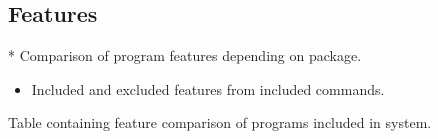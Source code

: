 \subsection{Features}\label{Features}

* Comparison of program features depending on package.

\begin{itemize}
    \item Included and excluded features from included commands.
\end{itemize}

Table containing feature comparison of programs included in system.

